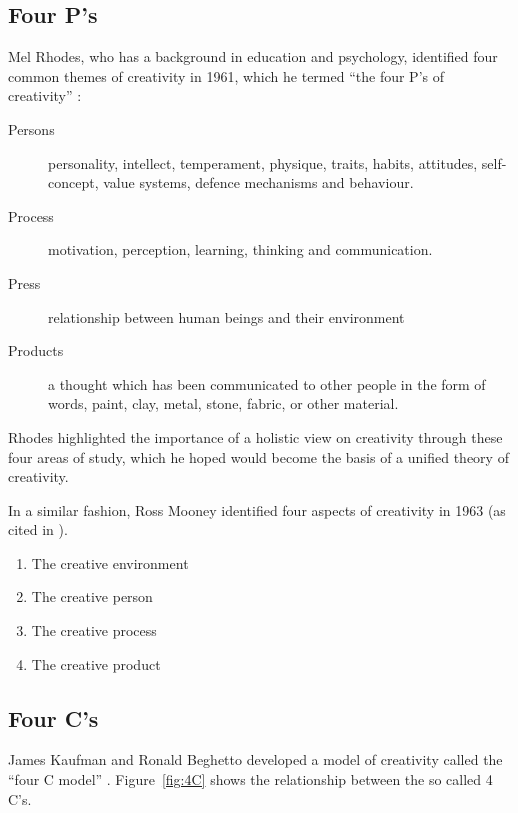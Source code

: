 \subsection{Four P's}

Mel Rhodes, who has a background in education and psychology, identified four common themes of creativity in 1961, which he termed ``the four P\rq s of creativity'' \citeyear{Rhodes1961}:

\begin{description}
  \item [Persons] personality, intellect, temperament, physique, traits, habits, attitudes, self-concept, value systems, defence mechanisms and behaviour.
  \item [Process] motivation, perception, learning, thinking and communication.
  \item [Press] relationship between human beings and their environment
  \item [Products] a thought which has been communicated to other people in the form of words, paint, clay, metal, stone, fabric, or other material.
\end{description}

Rhodes highlighted the importance of a holistic view on creativity through these four areas of study, which he hoped would become the basis of a unified theory of creativity.

In a similar fashion, Ross Mooney identified four aspects of creativity in 1963 (as cited in \autocite{Sternberg1999}).

\begin{enumerate}
  \item The creative environment
  \item The creative person
  \item The creative process
  \item The creative product
\end{enumerate}


\subsection{Four C's}

James Kaufman and Ronald Beghetto developed a model of creativity called the ``four C model'' \citeyear{Kaufman2009}. Figure~\ref{fig:4C} shows the relationship between the so called 4 C's.

